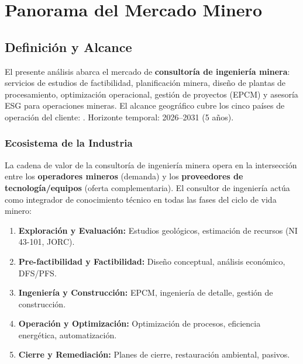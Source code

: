 \chapter{Panorama del Mercado Minero}

\section{Definición y Alcance}

\begin{calloutbox}
El presente análisis abarca el mercado de \textbf{consultoría de ingeniería minera}: servicios de estudios de factibilidad, planificación minera, diseño de plantas de procesamiento, optimización operacional, gestión de proyectos (EPCM) y asesoría ESG para operaciones mineras. El alcance geográfico cubre los cinco países de operación del cliente: . Horizonte temporal: 2026--2031 (5 años).
\end{calloutbox}

\subsection{Ecosistema de la Industria}

La cadena de valor de la consultoría de ingeniería minera opera en la intersección entre los \textbf{operadores mineros} (demanda) y los \textbf{proveedores de tecnología/equipos} (oferta complementaria). El consultor de ingeniería actúa como integrador de conocimiento técnico en todas las fases del ciclo de vida minero:

\begin{enumerate}
    \item \textbf{Exploración y Evaluación:} Estudios geológicos, estimación de recursos (NI 43-101, JORC).
    \item \textbf{Pre-factibilidad y Factibilidad:} Diseño conceptual, análisis económico, DFS/PFS.
    \item \textbf{Ingeniería y Construcción:} EPCM, ingeniería de detalle, gestión de construcción.
    \item \textbf{Operación y Optimización:} Optimización de procesos, eficiencia energética, automatización.
    \item \textbf{Cierre y Remediación:} Planes de cierre, restauración ambiental, pasivos.
\end{enumerate}

